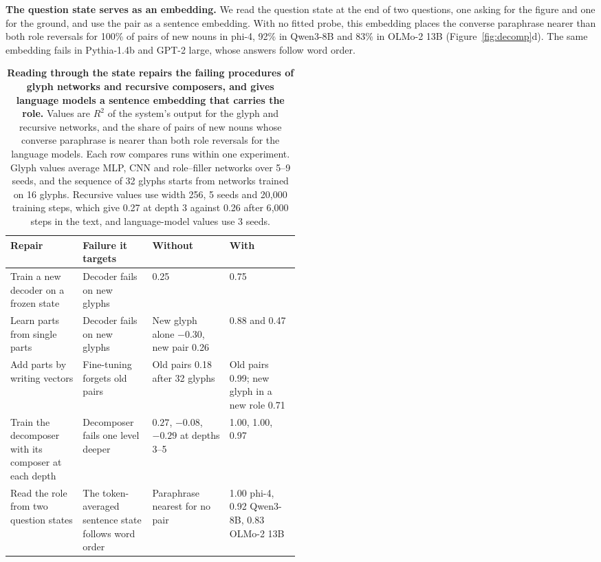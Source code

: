 \documentclass[10pt]{article}
\theoremstyle{plain}
\theoremstyle{remark}
\begin{document}
\textbf{The question state serves as an embedding.} We read the question state at the end of two questions, one asking for the figure and one for the ground, and use the pair as a sentence embedding. With no fitted probe, this embedding places the converse paraphrase nearer than both role reversals for 100\% of pairs of new nouns in phi-4, 92\% in Qwen3-8B and 83\% in OLMo-2 13B (Figure~\ref{fig:decomp}d). The same embedding fails in Pythia-1.4b and GPT-2 large, whose answers follow word order.

\begin{table}[t]
  \caption{\textbf{Reading through the state repairs the failing procedures of glyph networks and recursive composers, and gives language models a sentence embedding that carries the role.} Values are $R^2$ of the system's output for the glyph and recursive networks, and the share of pairs of new nouns whose converse paraphrase is nearer than both role reversals for the language models. Each row compares runs within one experiment. Glyph values average MLP, CNN and role--filler networks over 5--9 seeds, and the sequence of 32 glyphs starts from networks trained on 16 glyphs. Recursive values use width 256, 5 seeds and 20{,}000 training steps, which give 0.27 at depth 3 against 0.26 after 6{,}000 steps in the text, and language-model values use 3 seeds.}
  \label{tab:remedies}
  \centering\small
  \begin{tabularx}{\linewidth}{@{}P{0.25\linewidth}P{0.24\linewidth}YY@{}}
    \toprule
    Repair & Failure it targets & Without & With \\
    \midrule
    Train a new decoder on a frozen state & Decoder fails on new glyphs & 0.25 & 0.75 \\
    Learn parts from single parts & Decoder fails on new glyphs & New glyph alone $-0.30$, new pair 0.26 & 0.88 and 0.47 \\
    Add parts by writing vectors & Fine-tuning forgets old pairs & Old pairs 0.18 after 32 glyphs & Old pairs 0.99; new glyph in a new role 0.71 \\
    Train the decomposer with its composer at each depth & Decomposer fails one level deeper & $0.27$, $-0.08$, $-0.29$ at depths 3--5 & 1.00, 1.00, 0.97 \\
    Read the role from two question states & The token-averaged sentence state follows word order & Paraphrase nearest for no pair & 1.00 phi-4, 0.92 Qwen3-8B, 0.83 OLMo-2 13B \\
    \bottomrule
  \end{tabularx}
\end{table}
\end{document}
